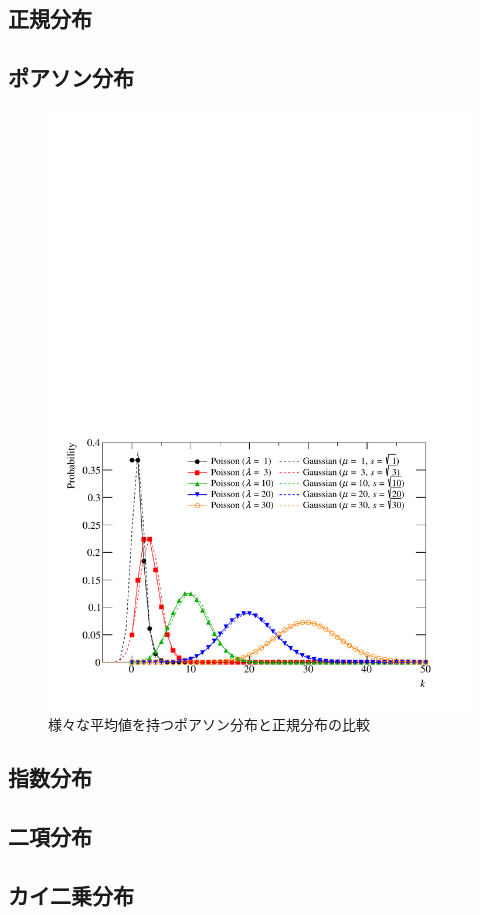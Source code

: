 \subsection{正規分布}
\subsection{ポアソン分布}



\begin{figure}
  \centering
  \includegraphics[width=12cm]{fig/Poisson.pdf}
  \caption{様々な平均値を持つポアソン分布と正規分布の比較}
  \label{fig_Poisson}
\end{figure}

\subsection{指数分布}
\subsection{二項分布}
\subsection{カイ二乗分布}

